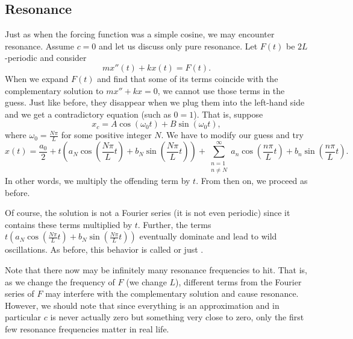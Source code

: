\subsection{Resonance}

Just as when the forcing function was a simple cosine, we may encounter
resonance.  Assume $c=0$ and let us discuss only pure resonance.
Let $F(t)$ be $2L$-periodic and consider
\begin{equation*}
m x''(t) + k x (t) = F(t) .
\end{equation*}
When we expand $F(t)$ and find that some of its terms coincide with the
complementary solution to $mx''+kx=0$, we cannot use those terms in the
guess.  Just like before, they disappear when we plug them into the left-hand
side and we get a contradictory equation (such as $0=1$).   That is,
suppose
\begin{equation*}
x_c = A \cos (\omega_0 t) + B \sin (\omega_0 t), 
\end{equation*}
where $\omega_0 = \frac{N \pi}{L}$ for some positive integer $N$.
We have
to modify our guess and try
\begin{equation*}
x(t) = \frac{a_0}{2} +
t \left(
a_N \cos \left( \frac{N \pi}{L} t \right) +
b_N \sin \left( \frac{N \pi}{L} t \right) \right) +
\sum_{\substack{n=1\\n\not= N}}^\infty
a_n \cos \left( \frac{n \pi}{L} t \right) +
b_n \sin \left( \frac{n \pi}{L} t \right) .
\end{equation*}
In other words, we multiply the offending term by $t$.  From then on, we
proceed as before.

Of course, the solution is not a Fourier series (it is not even
periodic) since it contains these terms multiplied by $t$.  Further, the
terms
$t \left( a_N \cos \left( \frac{N \pi}{L} t \right) +
b_N \sin \left( \frac{N \pi}{L} t \right) \right)$ eventually dominate and lead to
wild oscillations.  As before, this behavior is called \emph{} or just \emph{}.

Note that there now may be infinitely many resonance frequencies to hit.
That is, as we change the frequency of $F$ (we change $L$), different
terms from the Fourier series of $F$ may interfere with the complementary
solution and cause resonance.
However, we should note that since everything is an approximation and in
particular $c$ is never actually zero but something very close to zero,
only the first
few resonance frequencies matter in real life.

